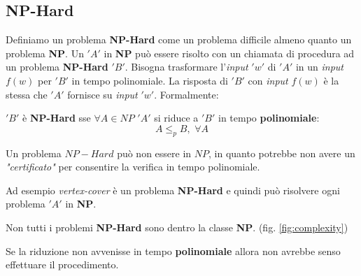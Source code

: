 						\subsection{NP-Hard}
						Definiamo un problema \textbf{NP-Hard} come un problema difficile almeno
						quanto un problema \textbf{NP}. Un $ 'A' $ in \textbf{NP} può
						essere risolto con un chiamata di procedura ad un problema \textbf{NP-Hard} $ 'B' $. 
						Bisogna trasformare l'\textit{input} $ 'w' $ di $ 'A' $ in un \textit{input}
						$f(w)$ per $ 'B' $ in tempo polinomiale. La risposta di $ 'B' $ con \textit{input} $f(w)$ è la
						stessa che $ 'A' $ fornisce su \textit{input} $ 'w' $. Formalmente:
						\begin{definizione}
							$ 'B' $ è \textbf{NP-Hard} sse $\forall A\in NP$ $ 'A' $ si riduce a $ 'B' $ in tempo
							\textbf{polinomiale}:
							\[A\leq_p B,\,\,\forall A\]
						\end{definizione}
						\begin{nota}
							Un problema $NP-Hard$ può non essere in $NP$, in quanto potrebbe non avere un
							\textit{"certificato"} per consentire la verifica in tempo polinomiale.
						\end{nota}
						\begin{nota}
							Ad esempio \textit{vertex-cover} è un problema \textbf{NP-Hard} e quindi può
							risolvere ogni problema $ 'A' $ in \textbf{NP}.
						\end{nota}
						\begin{nota}
							Non tutti i problemi \textbf{NP-Hard} sono dentro la classe \textbf{NP}. (fig. \ref{fig:complexity})
						\end{nota}
						\begin{nota}
							Se la riduzione non avvenisse in tempo \textbf{polinomiale} allora non avrebbe senso effettuare il procedimento.
						\end{nota}
